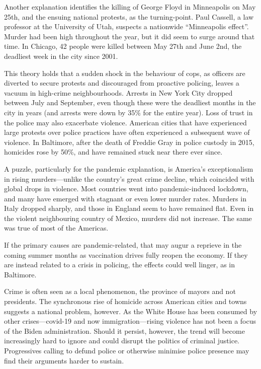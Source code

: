 \documentclass{article}
\begin{document}
Another explanation identifies the killing of George Floyd in Minneapolis on May 25th, and the ensuing national protests, as the turning-point. Paul Cassell, a law professor at the University of Utah, suspects a nationwide ``Minneapolis effect''. Murder had been high throughout the year, but it did seem to surge around that time. In Chicago, 42 people were killed between May 27th and June 2nd, the deadliest week in the city since 2001. 

This theory holds that a sudden shock in the behaviour of cops, as officers are diverted to secure protests and discouraged from proactive policing, leaves a vacuum in high-crime neighbourhoods. Arrests in New York City dropped between July and September, even though these were the deadliest months in the city in years (and arrests were down by 35\% for the entire year). Loss of trust in the police may also exacerbate violence. American cities that have experienced large protests over police practices have often experienced a subsequent wave of violence. In Baltimore, after the death of Freddie Gray in police custody in 2015, homicides rose by 50\%, and have remained stuck near there ever since. 

A puzzle, particularly for the pandemic explanation, is America's exceptionalism in rising murders---unlike the country's great crime decline, which coincided with global drops in violence. Most countries went into pandemic-induced lockdown, and many have emerged with stagnant or even lower murder rates. Murders in Italy dropped sharply, and those in England seem to have remained flat. Even in the violent neighbouring country of Mexico, murders did not increase. The same was true of most of the Americas. 

If the primary causes are pandemic-related, that may augur a reprieve in the coming summer months as vaccination drives fully reopen the economy. If they are instead related to a crisis in policing, the effects could well linger, as in Baltimore. 

Crime is often seen as a local phenomenon, the province of mayors and not presidents. The synchronous rise of homicide across American cities and towns suggests a national problem, however. As the White House has been consumed by other crises---covid-19 and now immigration---rising violence has not been a focus of the Biden administration. Should it persist, however, the trend will become increasingly hard to ignore and could disrupt the politics of criminal justice. Progressives calling to defund police or otherwise minimise police presence may find their arguments harder to sustain. 
\end{document}
